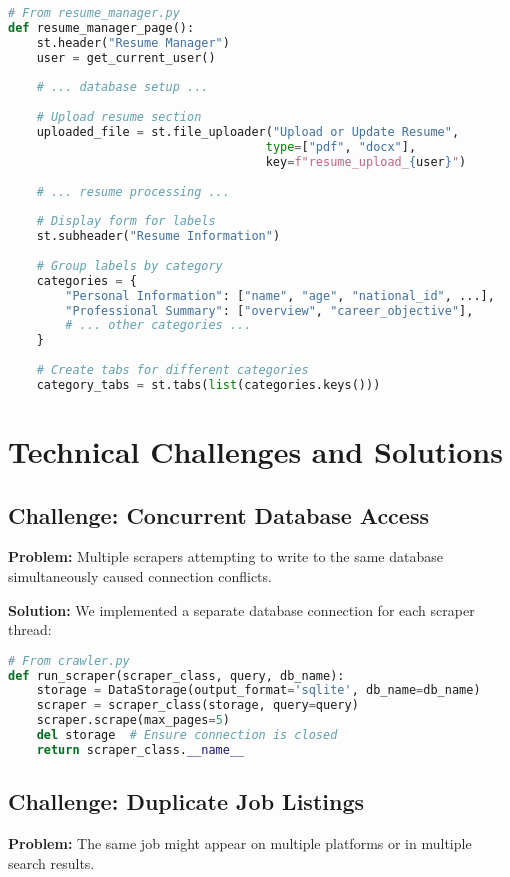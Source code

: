 \documentclass[12pt,a4paper]{report}
\begin{document}
\begin{lstlisting}[language=Python, caption=Resume Manager Implementation (Excerpt)]
# From resume_manager.py
def resume_manager_page():
    st.header("Resume Manager")
    user = get_current_user()
    
    # ... database setup ...
    
    # Upload resume section
    uploaded_file = st.file_uploader("Upload or Update Resume", 
                                    type=["pdf", "docx"], 
                                    key=f"resume_upload_{user}")
    
    # ... resume processing ...
    
    # Display form for labels
    st.subheader("Resume Information")
    
    # Group labels by category
    categories = {
        "Personal Information": ["name", "age", "national_id", ...],
        "Professional Summary": ["overview", "career_objective"],
        # ... other categories ...
    }
    
    # Create tabs for different categories
    category_tabs = st.tabs(list(categories.keys()))
\end{lstlisting}

\chapter{Technical Challenges and Solutions}

\section{Challenge: Concurrent Database Access}
\textbf{Problem:} Multiple scrapers attempting to write to the same database simultaneously caused connection conflicts.

\textbf{Solution:} We implemented a separate database connection for each scraper thread:

\begin{lstlisting}[language=Python, caption=Independent Database Connections]
# From crawler.py
def run_scraper(scraper_class, query, db_name):
    storage = DataStorage(output_format='sqlite', db_name=db_name)
    scraper = scraper_class(storage, query=query)
    scraper.scrape(max_pages=5)
    del storage  # Ensure connection is closed
    return scraper_class.__name__
\end{lstlisting}

\section{Challenge: Duplicate Job Listings}
\textbf{Problem:} The same job might appear on multiple platforms or in multiple search results.
\end{document}
